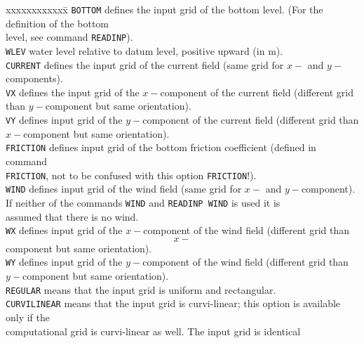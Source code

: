 \documentclass[12pt]{book}
\begin{document}
\begin{tabbing}
xxxxxxxxxxxx\= \kill
{\tt BOTTOM}        \> defines the input grid of the bottom level. (For the definition of the bottom\+\\
                       level, see command {\tt READINP}).\-\\
{\tt WLEV}          \> water level relative to datum level, positive upward (in m).\\
{\tt CURRENT}       \> defines the input grid of the current field (same grid for $x-$ and $y-$components).\\
{\tt VX}            \> defines the input grid of the $x-$component of the current field (different grid\+\\
                       than $y-$component but same orientation).\-\\
{\tt VY}            \> defines input grid of the $y-$component of the current field (different grid than\+\\
                       $x-$component but same orientation).\-\\
{\tt FRICTION}      \> defines input grid of the bottom friction coefficient (defined in command\+\\
                       {\tt FRICTION}, not to be confused with this option {\tt FRICTION}!).\-\\
{\tt WIND}          \> defines input grid of the wind field (same grid for $x-$ and $y-$component).\+\\
                       If neither of the commands {\tt WIND} and {\tt READINP WIND} is used it is\\
                       assumed that there is no wind.\-\\
{\tt WX}            \> defines input grid of the $x-$component of the wind field (different grid than\+\\
                       $$x-$$component but same orientation).\-\\
{\tt WY}            \> defines input grid of the $y-$component of the wind field (different grid than\+\\
                       $y-$component but same orientation).\-\\
{\tt REGULAR}       \> means that the input grid is uniform and rectangular.\\
{\tt CURVILINEAR}   \> means that the input grid is curvi-linear; this option is available only if the\+\\
                       computational grid is curvi-linear as well. The input grid is identical\\

\end{tabbing}
\end{document}
